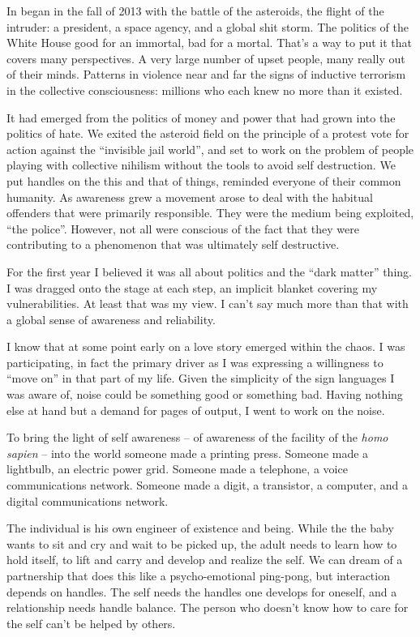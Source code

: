 

In began in the fall of 2013 with the battle of the asteroids, the
flight of the intruder: a president, a space agency, and a global shit
storm.  The politics of the White House good for an immortal, bad for
a mortal.  That's a way to put it that covers many perspectives.  A
very large number of upset people, many really out of their minds.
Patterns in violence near and far the signs of inductive terrorism in
the collective consciousness: millions who each knew no more than it
existed.

It had emerged from the politics of money and power that had grown
into the politics of hate.  We exited the asteroid field on the
principle of a protest vote for action against the ``invisible jail
world'', and set to work on the problem of people playing with
collective nihilism without the tools to avoid self destruction.  We
put handles on the this and that of things, reminded everyone of their
common humanity.  As awareness grew a movement arose to deal with the
habitual offenders that were primarily responsible.  They were the
medium being exploited, ``the police''.  However, not all were
conscious of the fact that they were contributing to a phenomenon that
was ultimately self destructive.

For the first year I believed it was all about politics and the ``dark
matter'' thing.  I was dragged onto the stage at each step, an
implicit blanket covering my vulnerabilities.  At least that was my
view.  I can't say much more than that with a global sense of
awareness and reliability.

I know that at some point early on a love story emerged within the
chaos.  I was participating, in fact the primary driver as I was
expressing a willingness to ``move on'' in that part of my life.
Given the simplicity of the sign languages I was aware of, noise could
be something good or something bad.  Having nothing else at hand but a
demand for pages of output, I went to work on the noise.

To bring the light of self awareness -- of awareness of the facility
of the {\it homo sapien} -- into the world someone made a printing
press.  Someone made a lightbulb, an electric power grid.  Someone
made a telephone, a voice communications network.  Someone made a
digit, a transistor, a computer, and a digital communications network.

The individual is his own engineer of existence and being.  While the
the baby wants to sit and cry and wait to be picked up, the adult
needs to learn how to hold itself, to lift and carry and develop and
realize the self.  We can dream of a partnership that does this like a
psycho-emotional ping-pong, but interaction depends on handles.  The
self needs the handles one develops for oneself, and a relationship
needs handle balance.  The person who doesn't know how to care for the
self can't be helped by others.

\bye
